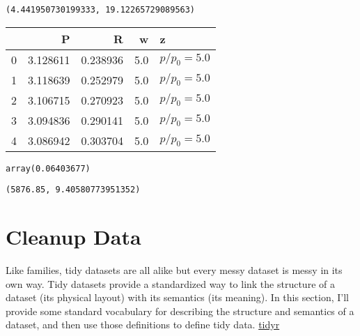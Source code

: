 \documentclass[10pt,parskip=half,
toc=sectionentrywithdots,
bibliography=totocnumbered,
captions=tableheading,numbers=noendperiod]{scrartcl}
\begin{document}
\begin{lstlisting}[language={},postbreak={},numbers=none,xrightmargin=7pt,breakindent=0pt,aboveskip=5pt,belowskip=5pt]
(4.441950730199333, 19.12265729089563)
\end{lstlisting}

\begin{table}[H]
\centering
\begin{adjustbox}{max width=\textwidth}
\begin{tabular}{lrrrl}
\toprule
{} &         P &         R &    w &            z \\
\midrule
0 &  3.128611 &  0.238936 &  5.0 &  $p/p_0=5.0$ \\
1 &  3.118639 &  0.252979 &  5.0 &  $p/p_0=5.0$ \\
2 &  3.106715 &  0.270923 &  5.0 &  $p/p_0=5.0$ \\
3 &  3.094836 &  0.290141 &  5.0 &  $p/p_0=5.0$ \\
4 &  3.086942 &  0.303704 &  5.0 &  $p/p_0=5.0$ \\
\bottomrule
\end{tabular}

\end{adjustbox}
\end{table}

\begin{lstlisting}[language={},postbreak={},numbers=none,xrightmargin=7pt,breakindent=0pt,aboveskip=5pt,belowskip=5pt]
array(0.06403677)
\end{lstlisting}

\begin{figure}[H]\begin{center}\end{center}\end{figure}

\begin{lstlisting}[language={},postbreak={},numbers=none,xrightmargin=7pt,breakindent=0pt,aboveskip=5pt,belowskip=5pt]
(5876.85, 9.40580773951352)
\end{lstlisting}

\hypertarget{cleanup-data}{%
\section{Cleanup Data}\label{cleanup-data}}

Like families, tidy datasets are all alike but every messy dataset is
messy in its own way. Tidy datasets provide a standardized way to link
the structure of a dataset (its physical layout) with its semantics (its
meaning). In this section, I'll provide some standard vocabulary for
describing the structure and semantics of a dataset, and then use those
definitions to define tidy data.
\href{https://tidyr.tidyverse.org/articles/tidy-data.html}{tidyr}
\end{document}
